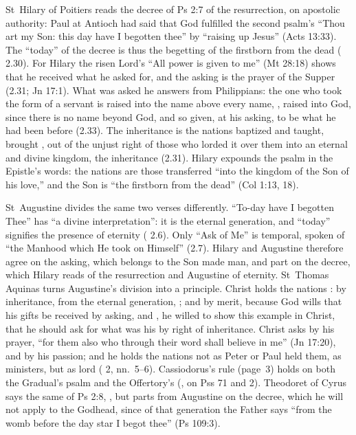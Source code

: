 St~Hilary of Poitiers reads the decree of Ps 2:7 of the resurrection, on
apostolic authority: Paul at Antioch had said that God fulfilled the second
psalm's ``Thou art my Son: this day have I begotten thee'' by ``raising up
Jesus'' (Acts 13:33). The ``today'' of the decree is thus the begetting of the
firstborn from the dead ( 2.30). For Hilary the
risen Lord's ``All power is given to me'' (Mt 28:18) shows that he received
what he asked for, and the asking is the prayer of the Supper (2.31; Jn 17:1). What was asked he
answers from Philippians: the one who took the form of a servant is raised
into the name above every name, , raised into God, since there is no name beyond God,
and so given, at his asking, to be what he had been before (2.33). The inheritance
is the nations baptized and taught, brought
, out of the unjust right of those
who lorded it over them into an eternal and divine kingdom, the inheritance
 (2.31). Hilary expounds the psalm in
the Epistle's words: the nations are those transferred ``into the kingdom of
the Son of his love,'' and the Son is ``the firstborn from the dead'' (Col
1:13, 18).

St~Augustine divides the same two verses differently. ``To-day have I begotten
Thee'' has ``a divine interpretation'': it is the eternal generation, and
``today'' signifies the presence of eternity (
2.6). Only ``Ask of Me'' is temporal, spoken of ``the Manhood which He took on
Himself'' (2.7). Hilary and Augustine therefore agree on the asking, which
belongs to the Son made man, and part on the decree, which Hilary reads of the
resurrection and Augustine of eternity. St~Thomas Aquinas turns Augustine's
division into a principle. Christ holds the nations : by inheritance, from the eternal
generation, ; and by merit, because
God wills that his gifts be received by asking, and , he willed to show this example in Christ, that he should ask for
what was his by right of inheritance. Christ asks by his prayer, ``for them
also who through their word shall believe in me'' (Jn 17:20), and by his
passion; and he holds the nations not as Peter or Paul held them, as
ministers, but as lord ( 2, nn.~5--6).
Cassiodorus's rule (page~3) holds on both the Gradual's psalm and the Offertory's
(, on Pss 71 and 2). Theodoret of Cyrus says
the same of Ps 2:8, , but
parts from Augustine on the decree, which he will not apply to the Godhead,
since of that generation the Father says ``from the womb before the day star
I begot thee'' (Ps 109:3).

